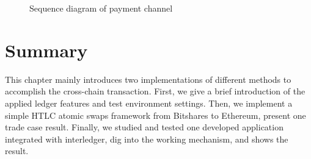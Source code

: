 \begin{figure}[H]
      \hfill
      \centering
    \caption{Sequence diagram of payment channel}
    \label{fig:dia}
\end{figure}

\section{Summary}
\noindent This chapter mainly introduces two implementations of different methods to accomplish the cross-chain transaction. First, we give a brief introduction of the applied ledger features and test environment settings. Then, we implement a simple HTLC atomic swaps framework from Bitshares to Ethereum, present one trade case result. Finally, we studied and tested one developed application integrated with interledger, dig into the working mechanism, and shows the result.
